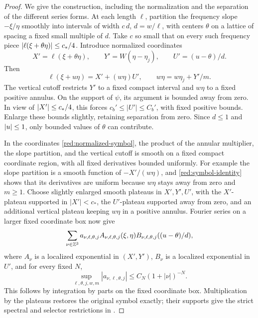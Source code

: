\begin{proof}
We give the construction, including the normalization and the
separation of the different series forms. At each length \(\ell\),
partition the frequency slope \(-\xi/\eta\) smoothly into
intervals of width \(c\,d\), \(d=w/\ell\), with centers
\(\theta\) on a lattice of spacing a fixed small multiple of
\(d\). Take \(c\) so small that on every such frequency piece
\(\left|\ell(\xi+\theta\eta)\right|\le c_*/4\).
Introduce normalized coordinates
\begin{equation}\label{red:normalized-symbol}
 X'=\ell(\xi+\theta\eta),\qquad
 Y'=W(\eta-\eta_j),\qquad
 U'=(u-\theta)/d.
\end{equation}
Then
\begin{equation}\label{red:symbol-identity}
 \ell(\xi+u\eta)=X'+(w\eta)U',\qquad
 w\eta=w\eta_j+Y'/m.
\end{equation}
The vertical cutoff restricts \(Y'\) to a fixed compact interval
and \(w\eta\) to a fixed positive annulus. On the support of
\(\psi\), its argument is bounded away from zero. In view of
\(\left|X'\right|\le c_*/4\), this forces
\(c_b'\le|U'|\le C_b'\), with fixed positive bounds. Enlarge
these bounds slightly, retaining separation from zero. Since
\(d\le1\) and \(\left|u\right|\le1\), only bounded values of
\(\theta\) can contribute.

In the coordinates \eqref{red:normalized-symbol}, the product of
the annular multiplier, the slope partition, and the vertical cutoff
is smooth on a fixed compact coordinate region, with all fixed
derivatives bounded uniformly. For example the slope partition is
a smooth function of
\(-X'/(w\eta)\), and \eqref{red:symbol-identity} shows that
its derivatives are uniform because \(w\eta\) stays away from
zero and \(m\ge1\). Choose slightly enlarged smooth plateaus in
\(X',Y',U'\), with the \(X'\)-plateau supported in
\(|X'|<c_*\), the \(U'\)-plateau supported away from zero, and
an additional vertical plateau keeping \(w\eta\) in a positive
annulus. Fourier series on a larger fixed coordinate box now give
\[
 \sum_{\nu\in\mathbb Z^3}
       a_{\nu,\ell,\theta,j}
       A_{\nu,\ell,\theta,j}(\xi,\eta)
       B_{\nu,\ell,\theta,j}((u-\theta)/d),
\]
where \(A_\nu\) is a localized exponential in \((X',Y')\),
\(B_\nu\) is a localized exponential in \(U'\), and for every
fixed \(N\),
\begin{equation}\label{red:fourier-series-decay}
 \sup_{\ell,\theta,j,w,m}|a_{\nu,\ell,\theta,j}|
          \le C_N(1+|\nu|)^{-N}.
\end{equation}
This follows by integration by parts on the fixed coordinate box.
Multiplication by the plateaus restores the original symbol exactly;
their supports give the strict spectral and selector restrictions
in .


\end{proof}

